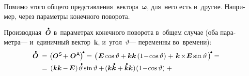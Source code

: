 \begin{otherlanguage}{russian}
Помимо этого общего представления~вектора~${\bm{\omega}}$, для~него есть и~другие. Например, через параметры конечного поворота.

Производная~${\mathdotabove{\rotationtensor}}$ в~параметрах конечного поворота в~общем случае (оба параметра\:--- и~единичный вектор~$\bm{k}$, и~угол~$\vartheta$\:--- переменны во~времени):
\vspace{.3em}%
\[
\begin{array}{r@{\hspace{.33em}}c@{\hspace{.25em}}l}
\mathdotabove{\rotationtensor} \hspace{.2em} & = & \hspace{.1em} \left(\rotationtensor^{\mathsf{\hspace{.12ex}S}} \hspace{-0.2ex} +^{\mathstrut} \rotationtensor^{\mathsf{\hspace{.12ex}A}}\right)^{\hspace{-0.2ex}\tikz[baseline=-0.5ex]\draw[black, fill=black] (0,0) circle (.266ex);} =
\hspace{.1em} \left(\hspace{.2ex} \tikzmark{StartBracePs} {\UnitDyad \operatorname{cos} \vartheta + \bm{k} \bm{k} \left({1 \!-\! \operatorname{cos} \vartheta}\right)} \hspace{-0.2ex} \tikzmark{EndBracePs} \hspace{.32ex} +^{\mathstrut} \hspace{.2ex}
\tikzmark{StartBracePa} {\bm{k} \hspace{-0.24ex}\times\hspace{-0.4ex} \UnitDyad \operatorname{sin} \vartheta \hspace{.2ex}} \tikzmark{EndBracePa} {} \hspace{.16ex}\right)^{\hspace{-0.2ex}\tikz[baseline=-0.5ex]\draw[black, fill=black] (0,0) circle (.266ex);} \hspace{-0.05em} =
\\[0.4em]
%
& = & \hspace{.2em} \tikzmark{StartBraceDotPs} {\left( \hspace{.1ex} \bm{k} \bm{k} \hspace{-0.1ex} - \hspace{-0.2ex} \UnitDyad \hspace{.1ex} \right) \hspace{-0.1ex} \mathdotabove{\vartheta} \operatorname{sin} \vartheta + \hspace{-0.2ex} ( \bm{k} \mathdotabove{\bm{k}} + \mathdotabove{\bm{k}} \bm{k} ) \hspace{-0.2ex} \left({1 \!-\! \operatorname{cos} \vartheta}\right)} \tikzmark{EndBraceDotPs} \hspace{.64ex} + \\[0.64em]

\end{array}\]
\end{otherlanguage}
